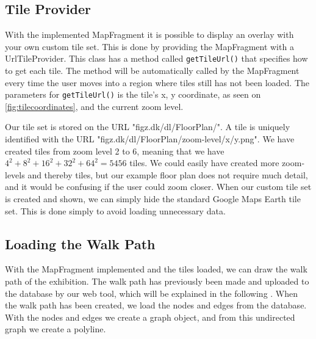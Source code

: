\subsection*{Tile Provider}
With the implemented MapFragment it is possible to display an overlay with your own custom tile set. This is done by providing the MapFragment with a UrlTileProvider\citep{tilecoordinates}. This class has a method called \lstinline|getTileUrl()| that specifies how to get each tile. The method will be automatically called by the MapFragment every time the user moves into a region where tiles still has not been loaded. The parameters for \lstinline|getTileUrl()| is the tile's x, y coordinate, as seen on \autoref{fig:tilecoordinates}, and the current zoom level.

Our tile set is stored on the URL "figz.dk/dl/FloorPlan/". A tile is uniquely identified with the URL "figz.dk/dl/FloorPlan/zoom-level/x/y.png". We have created tiles from zoom level 2 to 6, meaning that we have $4^2+8^2+16^2+32^2+64^2 = 5456$ tiles. We could easily have created more zoom-levels and thereby tiles, but our example floor plan does not require much detail, and it would be confusing if the user could zoom closer. When our custom tile set is created and shown, we can simply hide the standard Google Maps Earth tile set. This is done simply to avoid loading unnecessary data.

\subsection*{Loading the Walk Path}
With the MapFragment implemented and the tiles loaded, we can draw the walk path of the exhibition. The walk path has previously been made and uploaded to the database by our web tool, which will be explained in the following . When the walk path has been created, we load the nodes and edges from the database. With the nodes and edges we create a graph object, and from this undirected graph we create a polyline.

